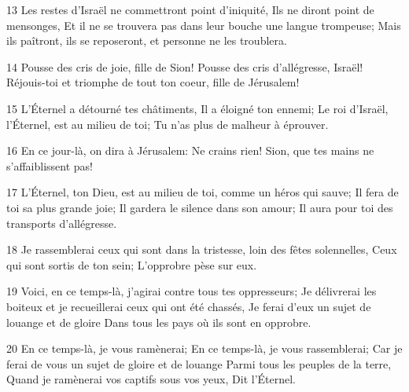 \par 13 Les restes d'Israël ne commettront point d'iniquité, Ils ne diront point de mensonges, Et il ne se trouvera pas dans leur bouche une langue trompeuse; Mais ils paîtront, ils se reposeront, et personne ne les troublera.
\par 14 Pousse des cris de joie, fille de Sion! Pousse des cris d'allégresse, Israël! Réjouis-toi et triomphe de tout ton coeur, fille de Jérusalem!
\par 15 L'Éternel a détourné tes châtiments, Il a éloigné ton ennemi; Le roi d'Israël, l'Éternel, est au milieu de toi; Tu n'as plus de malheur à éprouver.
\par 16 En ce jour-là, on dira à Jérusalem: Ne crains rien! Sion, que tes mains ne s'affaiblissent pas!
\par 17 L'Éternel, ton Dieu, est au milieu de toi, comme un héros qui sauve; Il fera de toi sa plus grande joie; Il gardera le silence dans son amour; Il aura pour toi des transports d'allégresse.
\par 18 Je rassemblerai ceux qui sont dans la tristesse, loin des fêtes solennelles, Ceux qui sont sortis de ton sein; L'opprobre pèse sur eux.
\par 19 Voici, en ce temps-là, j'agirai contre tous tes oppresseurs; Je délivrerai les boiteux et je recueillerai ceux qui ont été chassés, Je ferai d'eux un sujet de louange et de gloire Dans tous les pays où ils sont en opprobre.
\par 20 En ce temps-là, je vous ramènerai; En ce temps-là, je vous rassemblerai; Car je ferai de vous un sujet de gloire et de louange Parmi tous les peuples de la terre, Quand je ramènerai vos captifs sous vos yeux, Dit l'Éternel.


